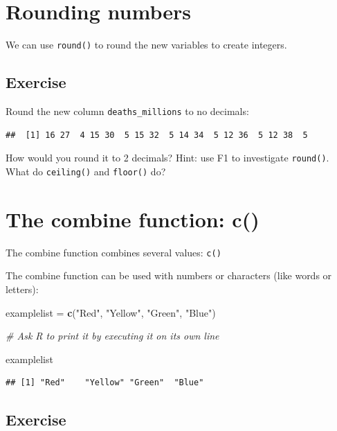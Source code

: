 \documentclass[]{book}
\makeatletter
\newenvironment{Shaded}{\begin{snugshade}}{\end{snugshade}}
\newcommand{\KeywordTok}[1]{\textcolor[rgb]{0.13,0.29,0.53}{\textbf{#1}}}
\newcommand{\StringTok}[1]{\textcolor[rgb]{0.31,0.60,0.02}{#1}}
\newcommand{\CommentTok}[1]{\textcolor[rgb]{0.56,0.35,0.01}{\textit{#1}}}
\newcommand{\NormalTok}[1]{#1}
\newenvironment{kframe}{%
\medskip{}
\setlength{\fboxsep}{.8em}
 \def\at@end@of@kframe{}%
 \ifinner\ifhmode%
  \def\at@end@of@kframe{\end{minipage}}%
  \begin{minipage}{\columnwidth}%
 \fi\fi%
 \def\FrameCommand##1{\hskip\@totalleftmargin \hskip-\fboxsep
 \colorbox{shadecolor}{##1}\hskip-\fboxsep
     \hskip-\linewidth \hskip-\@totalleftmargin \hskip\columnwidth}%
 \MakeFramed {\advance\hsize-\width
   \@totalleftmargin\z@ \linewidth\hsize
   \@setminipage}}%
 {\par\unskip\endMakeFramed%
 \at@end@of@kframe}
\renewenvironment{Shaded}{\begin{kframe}}{\end{kframe}}
\makeatother
\begin{document}
\section{Rounding numbers}\label{rounding-numbers}

We can use \texttt{round()} to round the new variables to create
integers.

\subsection{Exercise}\label{exercise-10}

Round the new column \texttt{deaths\_millions} to no decimals:

\begin{verbatim}
##  [1] 16 27  4 15 30  5 15 32  5 14 34  5 12 36  5 12 38  5
\end{verbatim}

How would you round it to 2 decimals? Hint: use F1 to investigate
\texttt{round()}. What do \texttt{ceiling()} and \texttt{floor()} do?

\section{The combine function: c()}\label{the-combine-function-c}

The combine function combines several values: \texttt{c()}

The combine function can be used with numbers or characters (like words
or letters):

\begin{Shaded}
\begin{Highlighting}[]
\NormalTok{examplelist =}\StringTok{ }\KeywordTok{c}\NormalTok{(}\StringTok{"Red"}\NormalTok{, }\StringTok{"Yellow"}\NormalTok{, }\StringTok{"Green"}\NormalTok{, }\StringTok{"Blue"}\NormalTok{)}

\CommentTok{# Ask R to print it by executing it on its own line}

\NormalTok{examplelist}
\end{Highlighting}
\end{Shaded}

\begin{verbatim}
## [1] "Red"    "Yellow" "Green"  "Blue"
\end{verbatim}

\subsection{Exercise}\label{exercise-11}
\end{document}
